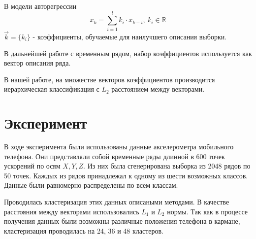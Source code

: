 \documentclass[12pt,twoside]{article}
\begin{document}
            В модели авторегрессии $$ x_k = \sum\limits_{i=1}^{l} k_i \cdot x_{k-i}, \ k_i \in \mathbb{R} $$
            $\vec{k} = \{k_i\}$ \-- коэффициенты, обучаемые для наилучшего описания выборки.

            В дальнейшей работе с временным рядом, набор коэффициентов используется как вектор описания ряда.

            В нашей работе, на множестве векторов коэффициентов производится иерархическая классификация с $L_2$ расстоянием между векторами.

  
			
    \section{Эксперимент}
        
        В ходе эксперимента были использованы данные акселерометра мобильного телефона.
        Они представляли собой временные ряды длинной в 600 точек ускорений по осям $X, Y, Z$.
        Из них была сгенерирована выборка из 2048 рядов по 50 точек.
        Каждых из рядов принадлежал к одному из шести возможных классов. Данные были равномерно распределены по всем классам.

        Проводилась кластеризация этих данных описаными методами. В качестве расстояния между векторами использовались $L_1$  и $L_2$ нормы.
        Так как в процессе получения данных были возможны различные положения телефона в кармане, кластеризация проводилась на 24, 36 и 48 кластеров.
\end{document}
